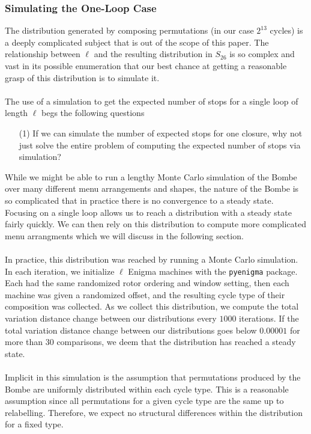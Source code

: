 \subsubsection{Simulating the One-Loop Case}
The distribution generated by composing permutations (in our case $2^{13}$ cycles) is a deeply complicated subject that is out of the scope of this paper. The relationship between $\ell$ and the resulting distribution in $S_{26}$ is so complex and vast in its possible enumeration that our best chance at getting a reasonable grasp of this distribution is to simulate it.
\\\\The use of a simulation to get the expected number of stops for a single loop of length $\ell$ begs the following questions
\begin{enumerate}
	\item[(1)] If we can simulate the number of expected stops for one closure, why not just solve the entire problem of computing the expected number of stops via simulation?
\end{enumerate}
While we might be able to run a lengthy Monte Carlo simulation of the Bombe over many different menu arrangements and shapes, the nature of the Bombe is so complicated that in practice there is no convergence to a steady state. Focusing on a single loop allows us to reach a distribution with a steady state fairly quickly. We can then rely on this distribution to compute more complicated menu arrangments which we will discuss in the following section.
\\\\In practice, this distribution was reached by running a Monte Carlo simulation. In each iteration, we initialize $\ell$ Enigma machines with the \texttt{pyenigma} package. Each had the same randomized rotor ordering and window setting, then each machine was given a randomized offset, and the resulting cycle type of their composition was collected. As we collect this distribution, we compute the total variation distance change between our distributions every $1000$ iterations. If the total variation distance change between our distributions goes below $0.00001$ for more than $30$ comparisons, we deem that the distribution has reached a steady state.
\\\\Implicit in this simulation is the assumption that permutations produced by the Bombe are uniformly distributed within each cycle type. This is a reasonable assumption since all permutations for a given cycle type are the same up to relabelling. Therefore, we expect no structural differences within the distribution for a fixed type.
